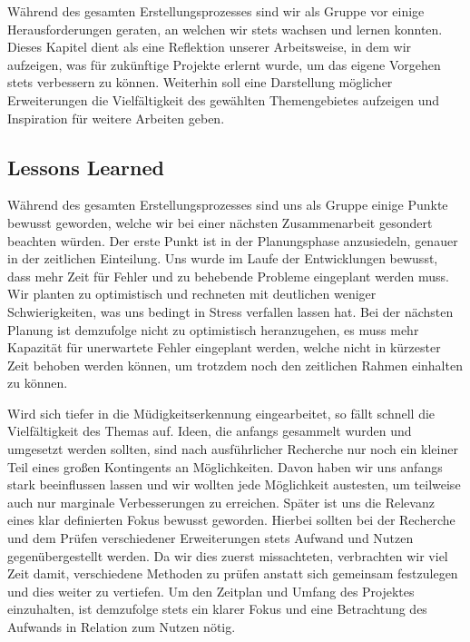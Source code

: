 Während des gesamten Erstellungsprozesses sind wir als Gruppe vor einige Herausforderungen geraten, an welchen wir stets wachsen und lernen konnten. Dieses Kapitel dient als eine Reflektion unserer Arbeitsweise, in dem wir aufzeigen, was für zukünftige Projekte erlernt wurde, um das eigene Vorgehen stets verbessern zu können. Weiterhin soll eine Darstellung möglicher Erweiterungen die Vielfältigkeit des gewählten Themengebietes aufzeigen und Inspiration für weitere Arbeiten geben.

\subsection{Lessons Learned}
Während des gesamten Erstellungsprozesses sind uns als Gruppe einige Punkte bewusst geworden, welche wir bei einer nächsten Zusammenarbeit gesondert beachten würden. Der erste Punkt ist in der Planungsphase anzusiedeln, genauer in der zeitlichen Einteilung. Uns wurde im Laufe der Entwicklungen bewusst, dass mehr Zeit für Fehler und zu behebende Probleme eingeplant werden muss. Wir planten zu optimistisch und rechneten mit deutlichen weniger Schwierigkeiten, was uns bedingt in Stress verfallen lassen hat. Bei der nächsten Planung ist demzufolge nicht zu optimistisch heranzugehen, es muss mehr Kapazität für unerwartete Fehler eingeplant werden, welche nicht in kürzester Zeit behoben werden können, um trotzdem noch den zeitlichen Rahmen einhalten zu können.

Wird sich tiefer in die Müdigkeitserkennung eingearbeitet, so fällt schnell die Vielfältigkeit des Themas auf. Ideen, die anfangs gesammelt wurden und umgesetzt werden sollten, sind nach ausführlicher Recherche nur noch ein kleiner Teil eines großen Kontingents an Möglichkeiten. Davon haben wir uns anfangs stark beeinflussen lassen und wir wollten jede Möglichkeit austesten, um teilweise auch nur marginale Verbesserungen zu erreichen. Später ist uns die Relevanz eines klar definierten Fokus bewusst geworden. Hierbei sollten bei der Recherche und dem Prüfen verschiedener Erweiterungen stets Aufwand und Nutzen gegenübergestellt werden. Da wir dies zuerst missachteten, verbrachten wir viel Zeit damit, verschiedene Methoden zu prüfen anstatt sich gemeinsam festzulegen und dies weiter zu vertiefen. Um den Zeitplan und Umfang des Projektes einzuhalten, ist demzufolge stets ein klarer Fokus und eine Betrachtung des Aufwands in Relation zum Nutzen nötig.


